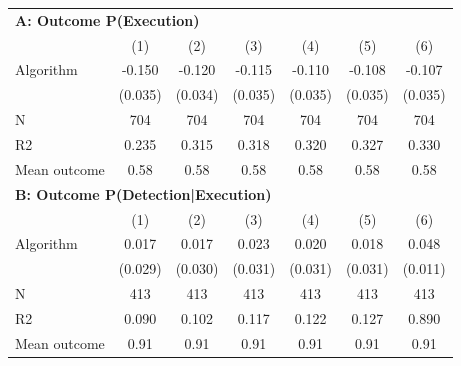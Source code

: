 \begin{tabular}{lcccccc} \toprule
\multicolumn{7}{l}{\textbf{A: Outcome P(Execution)}} \\ \multicolumn{1}{l}{} & (1) & (2) & (3) & (4) & (5) & (6) \\ \midrule
Algorithm   &      -0.150\sym{***}&      -0.120\sym{***}&      -0.115\sym{***}&      -0.110\sym{***}&      -0.108\sym{***}&      -0.107\sym{***}\\
            &     (0.035)         &     (0.034)         &     (0.035)         &     (0.035)         &     (0.035)         &     (0.035)         \\
\midrule
N           &         704         &         704         &         704         &         704         &         704         &         704         \\
R2          &       0.235         &       0.315         &       0.318         &       0.320         &       0.327         &       0.330         \\
Mean outcome&        0.58         &        0.58         &        0.58         &        0.58         &        0.58         &        0.58         \\

\midrule \multicolumn{7}{l}{\textbf{B: Outcome P(Detection|Execution)}} \\ \multicolumn{1}{l}{} & (1) & (2) & (3) & (4) & (5) & (6) \\ \midrule
Algorithm   &       0.017         &       0.017         &       0.023         &       0.020         &       0.018         &       0.048\sym{***}\\
            &     (0.029)         &     (0.030)         &     (0.031)         &     (0.031)         &     (0.031)         &     (0.011)         \\
\midrule
N           &         413         &         413         &         413         &         413         &         413         &         413         \\
R2          &       0.090         &       0.102         &       0.117         &       0.122         &       0.127         &       0.890         \\
Mean outcome&        0.91         &        0.91         &        0.91         &        0.91         &        0.91         &        0.91         \\


\end{tabular}
